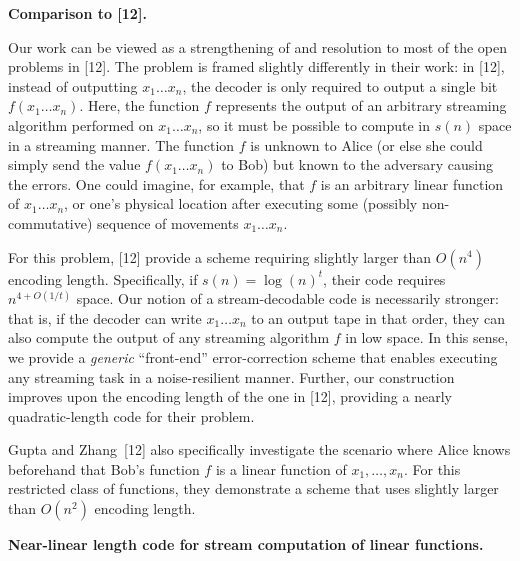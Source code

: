 \par\medskip\noindent\textbf{Comparison to [12].}\par




Our work can be viewed as a strengthening of and resolution to most of the open problems in [12].
The problem is framed slightly differently in their work: in [12], instead of outputting $x_{1}\ldots x_{n}$, the decoder is only required to output a single bit $f(x_{1}\ldots x_{n})$. Here, the function $f$ represents the output of an arbitrary streaming algorithm performed on $x_{1}\ldots x_{n}$, so it must be possible to compute in $s(n)$ space in a streaming manner. The function $f$ is unknown to Alice (or else she could simply send the value $f(x_{1}\ldots x_{n})$ to Bob) but known to the adversary causing the errors. One could imagine, for example, that $f$ is an arbitrary linear function of $x_{1}\ldots x_{n}$, or one’s physical location after executing some (possibly non-commutative) sequence of movements $x_{1}\ldots x_{n}$.\par




For this problem, [12] provide a scheme requiring slightly larger than $O(n^{4})$ encoding length. Specifically, if $s(n)=\log(n)^{t}$, their code requires $n^{4+O(1/t)}$ space. Our notion of a stream-decodable code is necessarily stronger: that is, if the decoder can write $x_{1}\ldots x_{n}$ to an output tape in that order, they can also compute the output of any streaming algorithm $f$ in low space. In this sense, we provide a \emph{generic} “front-end” error-correction scheme that enables executing any streaming task in a noise-resilient manner. Further, our construction improves upon the encoding length of the one in [12], providing a nearly quadratic-length code for their problem.\par




Gupta and Zhang [12] also specifically investigate the scenario where Alice knows beforehand that Bob’s function $f$ is a linear function of $x_{1},\dots,x_{n}$.
For this restricted class of functions, they demonstrate a scheme that uses slightly larger than $O(n^{2})$ encoding length.\par





\par\medskip\noindent\textbf{Near-linear length code for stream computation of linear functions.}\par




